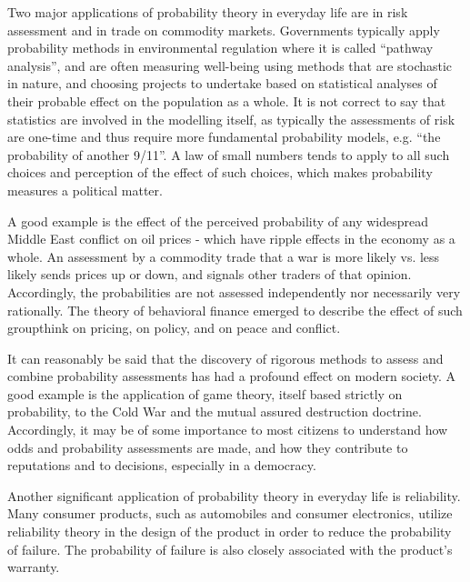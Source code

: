 {
Two major applications of probability theory in everyday life are in risk assessment and in trade on commodity markets. Governments typically apply probability methods in environmental regulation where it is called ``pathway analysis'', and are often measuring well-being using methods that are stochastic in nature, and choosing projects to undertake based on statistical analyses of their probable effect on the population as a whole. It is not correct to say that statistics are involved in the modelling itself, as typically the assessments of risk are one-time and thus require more fundamental probability models, e.g. ``the probability of another 9/11''. A law of small numbers tends to apply to all such choices and perception of the effect of such choices, which makes probability measures a political matter.

A good example is the effect of the perceived probability of any widespread Middle East conflict on oil prices - which have ripple effects in the economy as a whole. An assessment by a commodity trade that a war is more likely vs. less likely sends prices up or down, and signals other traders of that opinion. Accordingly, the probabilities are not assessed independently nor necessarily very rationally. The theory of behavioral finance emerged to describe the effect of such groupthink on pricing, on policy, and on peace and conflict.

It can reasonably be said that the discovery of rigorous methods to assess and combine probability assessments has had a profound effect on modern society. A good example is the application of game theory, itself based strictly on probability, to the Cold War and the mutual assured destruction doctrine. Accordingly, it may be of some importance to most citizens to understand how odds and probability assessments are made, and how they contribute to reputations and to decisions, especially in a democracy.

Another significant application of probability theory in everyday life is reliability. Many consumer products, such as automobiles and consumer electronics, utilize reliability theory in the design of the product in order to reduce the probability of failure. The probability of failure is also closely associated with the product's warranty.
}

